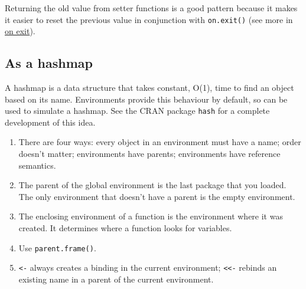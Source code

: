 Returning the old value from setter functions is a good pattern because
it makes it easier to reset the previous value in conjunction with
\texttt{on.exit()} (see more in \hyperref[on-exit]{on exit}).

\subsection{As a hashmap}

A hashmap is a data structure that takes constant, O(1), time to find an
object based on its name. Environments provide this behaviour by
default, so can be used to simulate a hashmap. See the CRAN package
\texttt{hash} for a complete development of this idea. 


\begin{enumerate}
\def\labelenumi{\arabic{enumi}.}
\item
  There are four ways: every object in an environment must have a name;
  order doesn't matter; environments have parents; environments have
  reference semantics.
\item
  The parent of the global environment is the last package that you
  loaded. The only environment that doesn't have a parent is the empty
  environment.
\item
  The enclosing environment of a function is the environment where it
  was created. It determines where a function looks for variables.
\item
  Use \texttt{parent.frame()}.
\item
  \texttt{\textless{}-} always creates a binding in the current
  environment; \texttt{\textless{}\textless{}-} rebinds an existing name
  in a parent of the current environment.
\end{enumerate}
